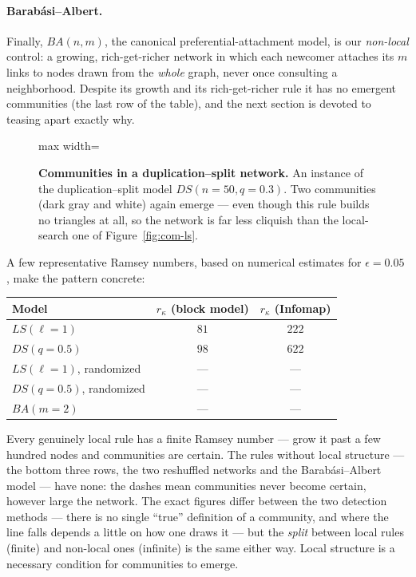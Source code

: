 \paragraph{Barab\'asi--Albert.} Finally, $BA(n,m)$, the canonical
preferential-attachment model, is our \emph{non-local} control: a growing,
rich-get-richer network in which each newcomer attaches its $m$ links to nodes
drawn from the \emph{whole} graph, never once consulting a neighborhood. Despite
its growth and its rich-get-richer rule it has no emergent communities (the last
row of the table), and the next section is devoted to teasing apart exactly why.

\begin{figure}[t]
\centering
\begin{adjustbox}{max width=\linewidth}\end{adjustbox}
\caption{\textbf{Communities in a duplication--split network.} An instance of the
duplication--split model $DS(n{=}50,q{=}0.3)$. Two communities (dark gray
and white) again emerge --- even though this rule builds no triangles at all, so the
network is far less cliquish than the local-search one of
Figure~\ref{fig:com-ls}.}
\label{fig:com-ds}
\end{figure}

A few representative Ramsey numbers, based on numerical estimates for $\epsilon=0.05$
\citep{vazquezcommunities2025}, make the pattern concrete:

\begin{center}
\begin{tabular}{lcc}
\hline
Model & $r_\kappa$ (block model) & $r_\kappa$ (Infomap) \\
\hline
$LS(\ell=1)$               & $81$   & $222$  \\
$DS(q=0.5)$             & $98$   & $622$  \\
$LS(\ell=1)$, randomized   & ---    & ---    \\
$DS(q=0.5)$, randomized & ---    & ---    \\
$BA(m=2)$               & ---    & ---    \\
\hline
\end{tabular}
\end{center}
Every genuinely local rule has a finite Ramsey number --- grow it past a few
hundred nodes and communities are certain. The rules without local structure ---
the bottom three rows, the two reshuffled networks and the Barab\'asi--Albert
model --- have none: the dashes mean communities never become certain, however
large the network. The exact figures differ between the
two detection methods --- there is no single ``true'' definition of a community,
and where the line falls depends a little on how one draws it --- but the
\emph{split} between local rules (finite) and non-local ones (infinite) is the
same either way. Local structure is a necessary condition for communities to
emerge.

